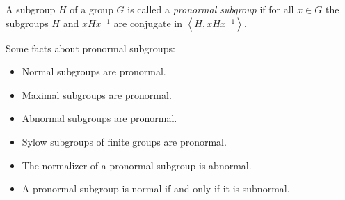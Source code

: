 \documentclass[12pt]{article}
\def\genby#1{{\left\langle #1\right\rangle}}
\begin{document}
A subgroup $H$ of a group $G$ is called a \emph{pronormal subgroup}
if for all $x\in G$ the subgroups $H$ and $xHx^{-1}$
are conjugate in $\genby{H,xHx^{-1}}$.

Some facts about pronormal subgroups:
\begin{itemize}
\item Normal subgroups are pronormal.
\item Maximal subgroups are pronormal.
\item Abnormal subgroups are pronormal.
\item Sylow subgroups of finite groups are pronormal.
\item The normalizer of a pronormal subgroup is abnormal.
\item A pronormal subgroup is normal if and only if it is subnormal.
\end{itemize}

\end{document}
